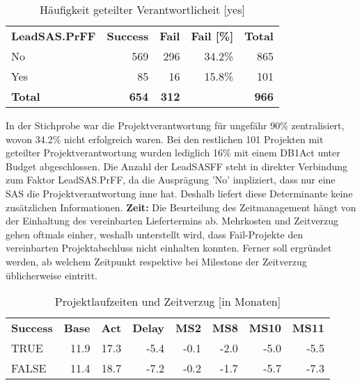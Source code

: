 \begin{table}[htbp]
	\centering
	\caption{Häufigkeit geteilter Verantwortlicheit [yes]}
	\begin{tabular}{lrrrr}
		\textbf{LeadSAS.PrFF} & \multicolumn{1}{l}{\textbf{Success}} & \multicolumn{1}{l}{\textbf{Fail}} & \multicolumn{1}{l}{\textbf{Fail [\%]}} & \multicolumn{1}{l}{\textbf{Total}} \\
		No    & 569   & 296   & 34.2\% & 865 \\
		Yes   & 85    & 16    & 15.8\% & 101 \\
		\textbf{Total} & \textbf{654} & \textbf{312} &       & \textbf{966} \\
	\end{tabular}%
	\label{tab:addlabel}%
\end{table}%
In der Stichprobe war die Projektverantwortung für ungefähr 90\% zentralisiert, wovon 34.2\% nicht erfolgreich waren. Bei den restlichen 101 Projekten mit geteilter Projektverantwortung wurden lediglich 16\% mit einem DB1Act unter Budget abgeschlossen. Die Anzahl der LeadSASFF steht in direkter Verbindung zum Faktor LeadSAS.PrFF, da die Ausprägung 'No' impliziert, dass nur eine SAS die Projektverantwortung inne hat. Deshalb liefert diese Determinante keine zusätzlichen Informationen. 
\newline\newline\textbf{Zeit:} Die Beurteilung des Zeitmanagement hängt von der Einhaltung des vereinbarten Liefertermins ab. Mehrkosten und Zeitverzug gehen oftmals einher, weshalb unterstellt wird, dass Fail-Projekte den vereinbarten Projektabschluss nicht einhalten konnten. Ferner soll ergründet werden, ab welchem Zeitpunkt respektive bei Milestone der Zeitverzug üblicherweise eintritt. 
\begin{table}[htbp]
	\centering
	\caption{Projektlaufzeiten und Zeitverzug [in Monaten]}
	\begin{tabular}{lrrrrrrr}
		\textbf{Success} & \multicolumn{1}{l}{\textbf{Base}} & \multicolumn{1}{l}{\textbf{Act}} & \multicolumn{1}{l}{\textbf{Delay}} & \multicolumn{1}{l}{\textbf{MS2}} & \multicolumn{1}{l}{\textbf{MS8}} & \multicolumn{1}{l}{\textbf{MS10}} & \multicolumn{1}{l}{\textbf{MS11}} \\
		TRUE  & 11.9  & 17.3  & -5.4  & -0.1  & -2.0  & -5.0  & -5.5 \\
		FALSE & 11.4  & 18.7  & -7.2  & -0.2  & -1.7  & -5.7  & -7.3 \\
	\end{tabular}%
	\label{tab:addlabel}%
\end{table}%
